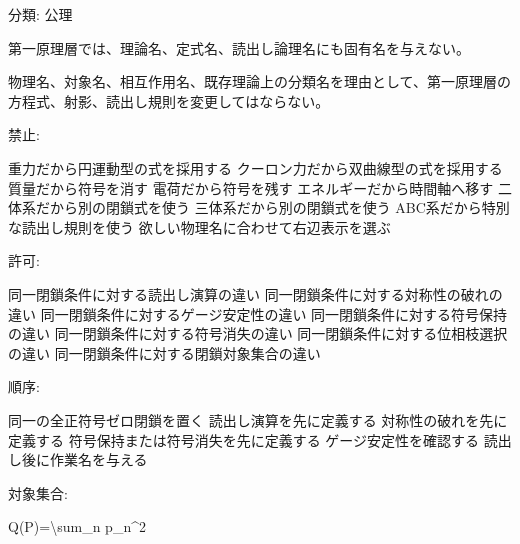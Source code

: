 \documentclass[
  a4paper]{ltjsarticle}
\newenvironment{Shaded}{}{}
\newcommand{\NormalTok}[1]{#1}
\begin{document}
分類: 公理

第一原理層では、理論名、定式名、読出し論理名にも固有名を与えない。

物理名、対象名、相互作用名、既存理論上の分類名を理由として、第一原理層の方程式、射影、読出し規則を変更してはならない。

禁止:

\begin{Shaded}
\begin{Highlighting}[]
\NormalTok{重力だから円運動型の式を採用する}
\NormalTok{クーロン力だから双曲線型の式を採用する}
\NormalTok{質量だから符号を消す}
\NormalTok{電荷だから符号を残す}
\NormalTok{エネルギーだから時間軸へ移す}
\NormalTok{二体系だから別の閉鎖式を使う}
\NormalTok{三体系だから別の閉鎖式を使う}
\NormalTok{ABC系だから特別な読出し規則を使う}
\NormalTok{欲しい物理名に合わせて右辺表示を選ぶ}
\end{Highlighting}
\end{Shaded}

許可:

\begin{Shaded}
\begin{Highlighting}[]
\NormalTok{同一閉鎖条件に対する読出し演算の違い}
\NormalTok{同一閉鎖条件に対する対称性の破れの違い}
\NormalTok{同一閉鎖条件に対するゲージ安定性の違い}
\NormalTok{同一閉鎖条件に対する符号保持の違い}
\NormalTok{同一閉鎖条件に対する符号消失の違い}
\NormalTok{同一閉鎖条件に対する位相枝選択の違い}
\NormalTok{同一閉鎖条件に対する閉鎖対象集合の違い}
\end{Highlighting}
\end{Shaded}

順序:

\begin{Shaded}
\begin{Highlighting}[]
\NormalTok{同一の全正符号ゼロ閉鎖を置く}
\NormalTok{読出し演算を先に定義する}
\NormalTok{対称性の破れを先に定義する}
\NormalTok{符号保持または符号消失を先に定義する}
\NormalTok{ゲージ安定性を確認する}
\NormalTok{読出し後に作業名を与える}
\end{Highlighting}
\end{Shaded}

対象集合:

\begin{Shaded}
\begin{Highlighting}[]
\NormalTok{Q(P)=\textbackslash{}sum\_n p\_n\^{}2}
\end{Highlighting}
\end{Shaded}
\end{document}
